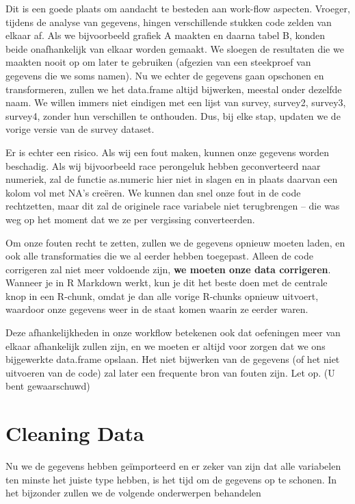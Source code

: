 \documentclass[]{tufte-book}
\begin{document}
Dit is een goede plaats om aandacht te besteden aan work-flow aspecten. Vroeger, tijdens de analyse van gegevens, hingen verschillende stukken code zelden van elkaar af. Als we bijvoorbeeld grafiek A maakten en daarna tabel B, konden beide onafhankelijk van elkaar worden gemaakt. We sloegen de resultaten die we maakten nooit op om later te gebruiken (afgezien van een steekproef van gegevens die we soms namen). Nu we echter de gegevens gaan opschonen en transformeren, zullen we het data.frame altijd bijwerken, meestal onder dezelfde naam. We willen immers niet eindigen met een lijst van survey, survey2, survey3, survey4, zonder hun verschillen te onthouden. Dus, bij elke stap, updaten we de vorige versie van de survey dataset.

Er is echter een risico. Als wij een fout maken, kunnen onze gegevens worden beschadig. Als wij bijvoorbeeld race perongeluk hebben geconverteerd naar numeriek, zal de functie as.numeric hier niet in slagen en in plaats daarvan een kolom vol met NA's creëren. We kunnen dan snel onze fout in de code rechtzetten, maar dit zal de originele race variabele niet terugbrengen -- die was weg op het moment dat we ze per vergissing converteerden.

Om onze fouten recht te zetten, zullen we de gegevens opnieuw moeten laden, en ook alle transformaties die we al eerder hebben toegepast. Alleen de code corrigeren zal niet meer voldoende zijn, \textbf{we moeten onze data corrigeren}. Wanneer je in R Markdown werkt, kun je dit het beste doen met de centrale knop in een R-chunk, omdat je dan alle vorige R-chunks opnieuw uitvoert, waardoor onze gegevens weer in de staat komen waarin ze eerder waren.

Deze afhankelijkheden in onze workflow betekenen ook dat oefeningen meer van elkaar afhankelijk zullen zijn, en we moeten er altijd voor zorgen dat we ons bijgewerkte data.frame opslaan. Het niet bijwerken van de gegevens (of het niet uitvoeren van de code) zal later een frequente bron van fouten zijn. Let op. (U bent gewaarschuwd)

\hypertarget{cleaning-data}{%
\section{Cleaning Data}\label{cleaning-data}}

Nu we de gegevens hebben geïmporteerd en er zeker van zijn dat alle variabelen ten minste het juiste type hebben, is het tijd om de gegevens op te schonen. In het bijzonder zullen we de volgende onderwerpen behandelen
\end{document}
